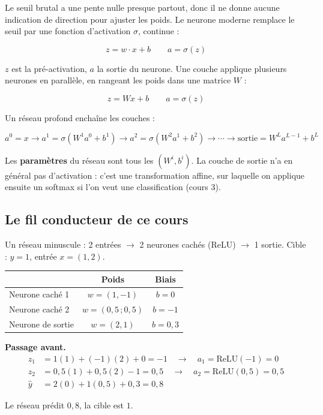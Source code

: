 \documentclass[11pt]{article}
\begin{document}
Le seuil brutal a une pente nulle presque partout, donc il ne donne aucune indication de direction pour ajuster les poids. Le neurone moderne remplace le seuil par une fonction d'activation $\sigma$, continue :

\[ z = w\cdot x + b \qquad a = \sigma(z) \]

$z$ est la pré-activation, $a$ la sortie du neurone. Une couche applique plusieurs neurones en parallèle, en rangeant les poids dans une matrice $W$ :

\[ z = Wx + b \qquad a = \sigma(z) \]

Un réseau profond enchaîne les couches :

\[ a^0 = x \to a^1 = \sigma(W^1a^0+b^1) \to a^2 = \sigma(W^2a^1+b^2) \to \cdots \to \text{sortie} = W^La^{L-1}+b^L \]

Les \textbf{paramètres} du réseau sont tous les $(W^i,b^i)$. La couche de sortie n'a en général pas d'activation : c'est une transformation affine, sur laquelle on applique ensuite un softmax si l'on veut une classification (cours 3).

\subsection*{Le fil conducteur de ce cours}

Un réseau minuscule : 2 entrées $\to$ 2 neurones cachés (ReLU) $\to$ 1 sortie. Cible : $y=1$, entrée $x=(1,2)$.

\begin{table}[h]
\centering
\begin{tabular}{lcc}
\toprule
 & Poids & Biais \\
\midrule
Neurone caché 1 & $w=(1,-1)$ & $b=0$ \\
Neurone caché 2 & $w=(0{,}5\,;0{,}5)$ & $b=-1$ \\
Neurone de sortie & $w=(2,1)$ & $b=0{,}3$ \\
\bottomrule
\end{tabular}
\end{table}

\textbf{Passage avant.}
\begin{align*}
z_1 &= 1(1)+(-1)(2)+0 = -1 \quad\to\quad a_1 = \mathrm{ReLU}(-1) = 0 \\
z_2 &= 0{,}5(1)+0{,}5(2)-1 = 0{,}5 \quad\to\quad a_2 = \mathrm{ReLU}(0{,}5) = 0{,}5 \\
\hat y &= 2(0)+1(0{,}5)+0{,}3 = 0{,}8
\end{align*}

Le réseau prédit $0{,}8$, la cible est $1$.
\end{document}
